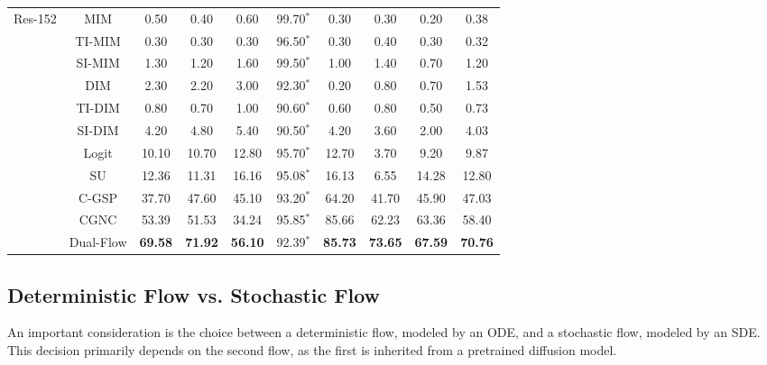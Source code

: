 \begin{table*}[h!]
{\begin{small}
\begin{sc}
\begin{tabular}{c|c|c|c|c|c|c|c|c|c}
             \hline
    \multirow{11}[0]{*}{Res-152} 
             & MIM      & 0.50     & 0.40     & 0.60     & 99.70$^*$ & 0.30     & 0.30     & 0.20   & 0.38\\
             & TI-MIM   & 0.30     & 0.30     & 0.30     & 96.50$^*$    & 0.30     & 0.40     & 0.30 & 0.32\\
             & SI-MIM   & 1.30     & 1.20     & 1.60     & 99.50$^*$    & 1.00     & 1.40     & 0.70 & 1.20\\
             & DIM      & 2.30     & 2.20     & 3.00     & 92.30$^*$    & 0.20     & 0.80     & 0.70 & 1.53\\
             & TI-DIM   & 0.80     & 0.70     & 1.00     & 90.60$^*$    & 0.60     & 0.80     & 0.50 & 0.73\\
             & SI-DIM   & 4.20     & 4.80     & 5.40     & 90.50$^*$    & 4.20     & 3.60     & 2.00 & 4.03\\
             & Logit    & 10.10    & 10.70    & 12.80    & 95.70$^*$    & 12.70    & 3.70     & 9.20 & 9.87\\
             & SU       & 12.36    & 11.31    & 16.16    & 95.08$^*$    & 16.13    & 6.55    & 14.28 & 12.80\\
             \cline{2-10}
             & C-GSP    & 37.70    & 47.60    & 45.10    & 93.20$^*$    & 64.20    & 41.70    & 45.90 & 47.03\\
             & CGNC     & 53.39    & 51.53    & 34.24    & 95.85$^*$    & 85.66    & 62.23    & 63.36 & 58.40\\
             & Dual-Flow&\textbf{69.58}&\textbf{71.92}&\textbf{56.10}&92.39$^*$&\textbf{85.73}&\textbf{73.65}&\textbf{67.59}&\textbf{70.76}\\
             \bottomrule
    \end{tabular}%
  \label{tab:main}%
  \end{sc}
  \end{small}}
    \vskip -0.1in
\end{table*}%

\subsection{Deterministic Flow vs. Stochastic Flow}
\label{subsection:df_vs_sf}

An important consideration is the choice between a deterministic flow, modeled by an ODE, and a stochastic flow, modeled by an SDE. This decision primarily depends on the second flow, as the first is inherited from a pretrained diffusion model.

